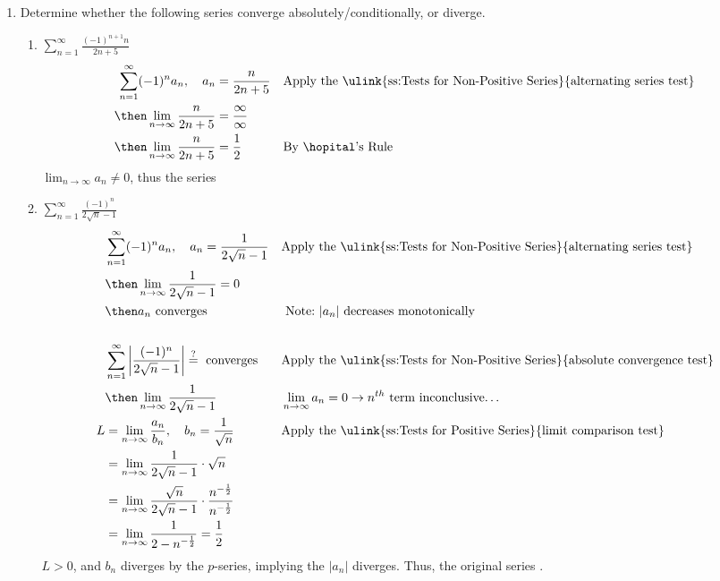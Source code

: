 \begin{enumerate}
\newpage %
  \item Determine whether the following series converge absolutely/conditionally, or diverge.
    \begin{enumerate}[itemsep=6em]
      \item \(\displaystyle \sum_{n=1}^{\infty} \frac{(-1)^{n+1}n }{2n+5}\)
        \begin{align*}
          \sum_{n=1}^{\infty} (-1)^n a_n, \quad a_n &= \frac{n}{2n+5}
          && \text{Apply the \ulink{ss:Tests for Non-Positive Series}{alternating series test}} \\
          \then \lim_{n \to \infty} \frac{n}{2n+5} &= \frac{\infty}{\infty} \\
          \then \lim_{n \to \infty} \frac{n}{2n+5} &= \frac{1}{2}
          && \text{By \hopital's Rule}
        \end{align*}
        \(\lim_{n \to \infty} a_n \neq 0 \), thus the series 

      \item \(\displaystyle \sum_{n=1}^{\infty} \frac{(-1)^n}{2\sqrt{n} - 1} \)
        \begin{align*}
          &\sum_{n=1}^{\infty} (-1)^n a_n, \quad a_n = \frac{1}{2\sqrt{n} - 1}
          && \text{Apply the \ulink{ss:Tests for Non-Positive Series}{alternating series test}} \\
          &\then \lim_{n \to \infty} \frac{1}{2\sqrt{n}-1} = 0 \\
          &\then a_n ~\text{converges}
          && ~\text{Note:}~|a_n| ~\text{decreases monotonically} \\\\
          &\sum_{n=1}^{\infty} \left|  \frac{(-1)^n}{2\sqrt{n} - 1} \right|
          \stackrel{?}{=} ~\text{converges}
          && \text{Apply the \ulink{ss:Tests for Non-Positive Series}{absolute convergence test}} \\
          &\then \lim_{n \to \infty}  \frac{1}{2\sqrt{n} - 1}
          && \lim_{n \to \infty} a_n = 0 \to n^{th}~\text{term inconclusive\ldots} \\
          L &= \lim_{n \to \infty} \frac{a_n}{b_n}, \quad b_n = \frac{1}{\sqrt{n} }
          && \text{Apply the \ulink{ss:Tests for Positive Series}{limit comparison test}} \\
          &= \lim_{n \to \infty}  \frac{1}{2\sqrt{n} - 1}
          \cdot \sqrt{n}\\
          &= \lim_{n \to \infty}  \frac{\sqrt{n} }{2\sqrt{n} - 1} \cdot \frac{n^{-\frac{1}{2}}}{n^{-\frac{1}{2}}} \\
          &= \lim_{n \to \infty}  \frac{1}{2 - n^{-\frac{1}{2}} } = \frac{1}{2}
        \end{align*}
        \(L > 0\), and \(b_n\) diverges by the \(p\)-series, implying the \(|a_n|\)
        diverges. Thus, the original series .
    \end{enumerate}


\end{enumerate}

